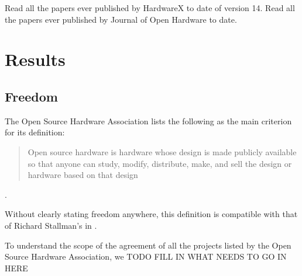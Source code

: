\documentclass{article}
\begin{document}
Read all the papers ever published by HardwareX to date of version 14. 
Read all the papers ever published by Journal of Open Hardware to date.

\section{Results}

\subsection{Freedom}
The Open Source Hardware Association lists the following as the main criterion for its definition:
\begin{quote}
Open source hardware is hardware whose design is made publicly available so that anyone can study, modify, distribute, make, and sell the design or hardware based on that design 
\end{quote}
\cite{OSH_association_def}.

Without clearly stating freedom anywhere, this definition is compatible with that of Richard Stallman's in \cite{b0_stallman}.

To understand the scope of the agreement of all the projects listed by the Open Source Hardware Association, we 
TODO FILL IN WHAT NEEDS TO GO IN HERE

\nocite{*}
\printbibliography
\end{document}
